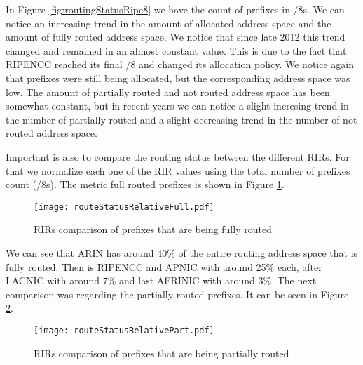 \documentclass[11pt,a4paper]{scrreprt}
\begin{document}

In Figure \ref{fig:routingStatusRipe8} we have the count of prefixes in /8s. We can notice an increasing trend in the amount of allocated address space and the amount of fully routed address space. We notice that since late 2012 this trend changed and remained in an almost constant value. This is due to the fact that RIPENCC reached its final /8 and changed its allocation policy. We notice again that prefixes were still being allocated, but the corresponding address space was low. The amount of partially routed and not routed address space has been somewhat constant, but in recent years we can notice a slight incresing trend in the number of partially routed and a slight decreasing trend in the number of not routed address space.


Important is also to compare the routing status between the different RIRs. For that we normalize each one of the RIR values using the total number of prefixes count (/8s). The metric full routed prefixes is shown in Figure \ref{fig:routingStatusRelativeFull}.  

\begin{figure}[!h]
\centering
\texttt{[image: routeStatusRelativeFull.pdf]}
\caption{RIRs comparison of prefixes that are being fully routed}
\label{fig:routingStatusRelativeFull}
\end{figure}

We can see that ARIN has around 40\% of the entire routing address space that is fully routed. Then is RIPENCC and APNIC with around 25\% each, after LACNIC with around 7\% and last AFRINIC  with around 3\%.  
The next comparison was regarding the partially routed prefixes. It can be seen in Figure \ref{fig:routingStatusRelativePart}. 

\begin{figure}[!h]
\centering
\texttt{[image: routeStatusRelativePart.pdf]}
\caption{RIRs comparison of prefixes that are being partially routed}
\label{fig:routingStatusRelativePart}
\end{figure}
\end{document}
